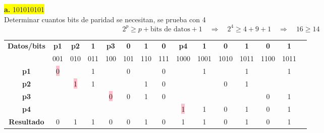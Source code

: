 \documentclass{article}
\begin{document}
	\newpage
	\begin{center}
	\hspace{3cm}\colorbox{yellow}{{\textbf{a.} 101010101}}\newline
	\\Determinar cuantos bits de paridad se necesitan, se prueba con 4
	\[
	2^p \geq p + \text{bits de datos} + 1
	\quad \Rightarrow \quad	2^4 \geq 4 + 9 + 1 \quad \Rightarrow \quad 16 \geq 14
	\]
	
	\begin{table}[h!]
		\centering
		\begin{tabular}{c|cccccccccccccc}
			\toprule
			\textbf{Datos/bits} & \textbf{p1} & \textbf{p2} & \textbf{1} & \textbf{p3} & \textbf{0} & \textbf{1} & \textbf{0} & \textbf{p4} & \textbf{1} & \textbf{0} & \textbf{1} & \textbf{0} & \textbf{1}\\ & \scriptsize001 & \scriptsize010 & \scriptsize011 & \scriptsize100 & \scriptsize101 & \scriptsize110 & \scriptsize111 & \scriptsize1000 & \scriptsize1001 & \scriptsize1010 & \scriptsize1011 & \scriptsize1100 & \scriptsize1011 \\
			\midrule
			\textbf{p1} & \colorbox{pink}{0} & & 1 & & 0 & & 0 & & 1 & & 1 & & 1 \\
			\midrule
			\textbf{p2} &  & \colorbox{pink}{1} & 1 & & & 1 & 0 & & & 0 & 1 & &  \\
			\midrule
			\textbf{p3} &  & & & \colorbox{pink}{0} & 0 & 1 & 0 & & & & & 0 & 1 \\
			\midrule
			\textbf{p4} & & & & & & & & \colorbox{pink}{1} & 1 & 0 & 1 & 0 & 1 \\
			\midrule
			\midrule
			\textbf{Resultado} & 0 & 1 & 1 & 0 & 0 & 1 & 0 & 1 & 1 & 0 & 1 & 0 & 1 \\
			\bottomrule
		\end{tabular}
	\end{table}
	\end{center}	
\end{document}
